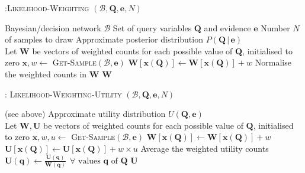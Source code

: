 \begin{algorithm}[ht]
\caption{:\textsc{Likelihood-Weighting} $(\mathcal{B},\mathbf{Q}, \mathbf{e}, N)$}
\begin{algorithmic} \vspace{2mm} 
\REQUIRE Bayesian/decision network $\mathcal{B}$
\REQUIRE Set of query variables $\mathbf{Q}$ and evidence $\mathbf{e}$
\REQUIRE Number $N$ of samples to draw
\ENSURE Approximate posterior distribution $P(\mathbf{Q} \, | \, \mathbf{e})$ \\[2mm]
\STATE Let $\mathbf{W}$ be vectors of weighted counts for each possible value of $\mathbf{Q}$, initialised to zero
\STATE $\mathbf{x}, w \leftarrow $ \textsc{Get-Sample}$(\mathcal{B}, \mathbf{e})$ 
\STATE $\mathbf{W}[\mathbf{x}(\mathbf{Q})] \leftarrow \mathbf{W}[\mathbf{x}(\mathbf{Q})] + w$
\ENDFOR
\STATE Normalise the weighted counts in $\mathbf{W}$
\RETURN $\mathbf{W}$  \vspace{1mm} 
\end{algorithmic}
\label{algo:lw}
\end{algorithm}

\begin{algorithm}[ht]
\caption{: \textsc{Likelihood-Weighting-Utility} $(\mathcal{B},\mathbf{Q}, \mathbf{e}, N)$}
\begin{algorithmic} \vspace{2mm} 
\REQUIRE (see above)
\ENSURE Approximate utility distribution $U(\mathbf{Q}, \mathbf{e})$ \\[2mm]
\STATE Let $\mathbf{W}, \mathbf{U}$ be vectors of weighted counts for each possible value of $\mathbf{Q}$, initialised to zero
\STATE $\mathbf{x}, w, u \leftarrow $ \textsc{Get-Sample}$(\mathcal{B}, \mathbf{e})$ 
\STATE $\mathbf{W}[\mathbf{x}(\mathbf{Q})] \leftarrow \mathbf{W}[\mathbf{x}(\mathbf{Q})] + w$
\STATE $\mathbf{U}[\mathbf{x}(\mathbf{Q})] \leftarrow \mathbf{U}[\mathbf{x}(\mathbf{Q})] + w \times u$
\ENDFOR
\STATE Average the weighted utility counts $\mathbf{U}(\mathbf{q}) \leftarrow \frac{\mathbf{U}(\mathbf{q})}{\mathbf{W}(\mathbf{q})} \ \ \forall \text{ values } \mathbf{q} \text{ of } \mathbf{Q}$ 
\RETURN $\mathbf{U}$  \vspace{1mm} 
\end{algorithmic}
\label{algo:lwu}
\end{algorithm}


